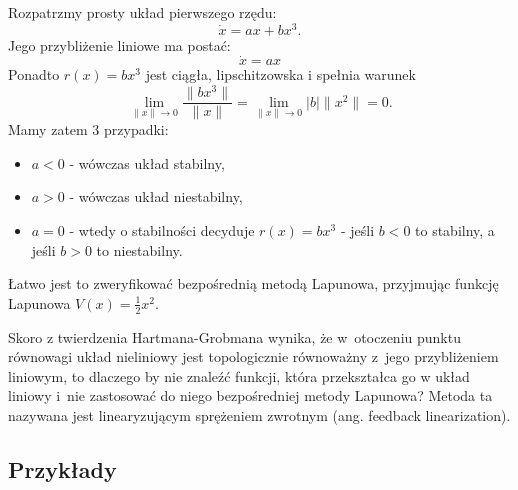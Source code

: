 \documentclass{article}
\begin{document}
\begin{tcolorbox}[colback=green!5, colframe=green!75!black, title=Przykład]
Rozpatrzmy prosty układ pierwszego rzędu:
$$
    \dot{x} = ax + bx^3.
$$
Jego przybliżenie liniowe ma postać:
$$
    \dot{x} = ax
$$
Ponadto $r(x) = bx^3$ jest ciągła, lipschitzowska i spełnia warunek
$$
    \lim_{\lVert x \rVert \rightarrow 0} \frac{\lVert bx^3 \rVert}{\lVert x \rVert} = \lim_{\lVert x \rVert \rightarrow 0} |b| \lVert x^2 \rVert = 0.
$$
Mamy zatem 3 przypadki:
\begin{itemize}
    \item $a<0$ - wówczas układ stabilny,
    \item $a>0$ - wówczas układ niestabilny,
    \item $a=0$ - wtedy o stabilności decyduje $r(x) = bx^3$ - jeśli $b<0$ to stabilny, a jeśli $b>0$ to niestabilny.
\end{itemize}
Łatwo jest to zweryfikować bezpośrednią metodą Lapunowa, przyjmując funkcję Lapunowa $V(x) = \frac{1}{2}x^{2}$.
\end{tcolorbox}

\begin{tcolorbox}[colback=orange!5, colframe=orange!75!black, title=Uwaga]
    Skoro z twierdzenia Hartmana-Grobmana wynika, że w~otoczeniu punktu
    równowagi układ nieliniowy jest topologicznie równoważny z~jego
    przybliżeniem liniowym, to dlaczego by nie znaleźć funkcji, która
    przekształca go w układ liniowy i~nie zastosować do niego bezpośredniej
    metody Lapunowa?
    Metoda ta nazywana jest linearyzującym sprężeniem zwrotnym (ang. feedback
    linearization).
\end{tcolorbox} 

    \subsection{Przykłady}
\end{document}

